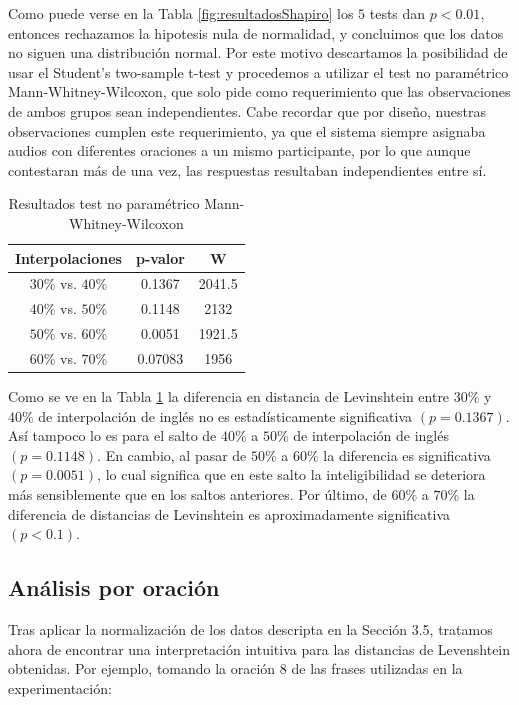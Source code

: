 Como puede verse en la Tabla \ref{fig:resultadosShapiro} los $5$ tests dan $p<0.01$, entonces rechazamos la hipotesis nula de normalidad, y concluimos que los datos no siguen una distribución normal. Por este motivo descartamos la posibilidad de usar el Student's two-sample t-test y procedemos a utilizar el test no paramétrico Mann-Whitney-Wilcoxon, que solo pide como requerimiento que las observaciones de ambos grupos sean independientes. Cabe recordar que por diseño, nuestras observaciones cumplen este requerimiento, ya que el sistema siempre asignaba audios con diferentes oraciones a un mismo participante, por lo que aunque contestaran más de una vez, las respuestas resultaban independientes entre sí.

\begin{table}
\begin{tabular}[t]{| c | c | c |}
\hline
Interpolaciones & p-valor & W \\
\hline
\hline
$30\%$ vs. $40\%$ & 0.1367 & 2041.5 \\
\hline
$40\%$ vs. $50\%$ & 0.1148 & 2132 \\
\hline
$50\%$ vs. $60\%$ & 0.0051 & 1921.5 \\
\hline
$60\%$ vs. $70\%$ & 0.07083 & 1956 \\
\hline
\end{tabular}
\caption{Resultados test no paramétrico Mann-Whitney-Wilcoxon} 
\label{tabla:Whitney}
\end{table}

Como se ve en la Tabla \ref{tabla:Whitney} la diferencia en distancia de Levinshtein entre $30\%$ y $40\%$ de interpolación de inglés no es estadísticamente significativa $(p=0.1367)$. Así tampoco lo es para el salto de $40\%$ a $50\%$ de interpolación de inglés $(p=0.1148)$. En cambio, al pasar de $50\%$ a $60\%$ la diferencia es significativa $(p=0.0051)$, lo cual  significa que en este salto la inteligibilidad se deteriora más sensiblemente que en los saltos anteriores. Por último, de $60\%$ a $70\%$ la diferencia de distancias de Levinshtein es aproximadamente significativa $(p<0.1)$.

\subsection{Análisis por oración}
Tras aplicar la normalización de los datos descripta en la Sección 3.5, tratamos ahora de encontrar una interpretación intuitiva para las distancias de Levenshtein obtenidas. Por ejemplo, tomando la oración $8$ de las frases utilizadas en la experimentación:

